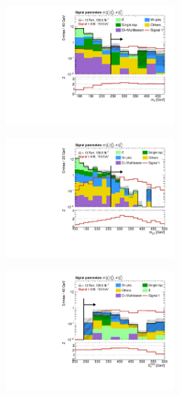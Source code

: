 \begin{figure}
	\centering
	\begin{subfigure}[b]{0.5\linewidth}
		\centering\includegraphics[width=0.7\textwidth]{N-1_cut_scan/n1_800_150/mt}
		\caption{}
	\end{subfigure}\hfill
	\begin{subfigure}[b]{0.5\linewidth}
		\centering\includegraphics[width=0.7\textwidth]{N-1_cut_scan/n1_800_150/mct}
		\caption{}
	\end{subfigure}\hfill
	\begin{subfigure}[b]{0.5\linewidth}
		\centering\includegraphics[width=0.7\textwidth]{N-1_cut_scan/n1_800_150/met}

\end{subfigure}
\end{figure}
